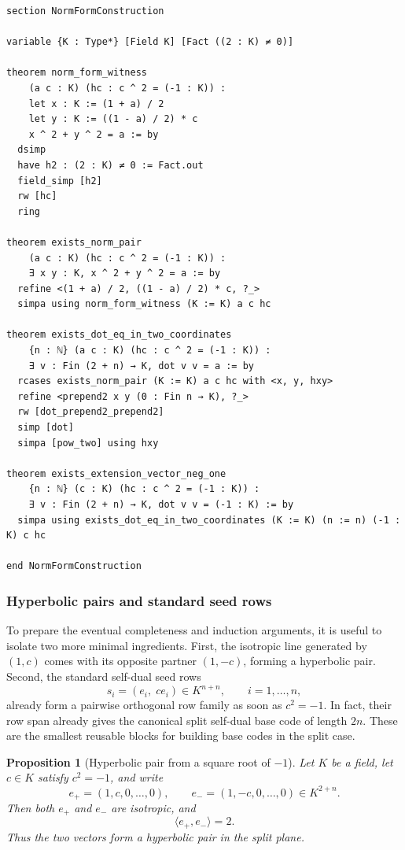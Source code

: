 \documentclass[12pt]{article}
\newtheorem{prop}[theorem]{Proposition}
\begin{document}
\begin{lstlisting}[caption={Lean verification for Theorem~\ref{thm:norm-witness}.}]
section NormFormConstruction

variable {K : Type*} [Field K] [Fact ((2 : K) ≠ 0)]

theorem norm_form_witness
    (a c : K) (hc : c ^ 2 = (-1 : K)) :
    let x : K := (1 + a) / 2
    let y : K := ((1 - a) / 2) * c
    x ^ 2 + y ^ 2 = a := by
  dsimp
  have h2 : (2 : K) ≠ 0 := Fact.out
  field_simp [h2]
  rw [hc]
  ring

theorem exists_norm_pair
    (a c : K) (hc : c ^ 2 = (-1 : K)) :
    ∃ x y : K, x ^ 2 + y ^ 2 = a := by
  refine <(1 + a) / 2, ((1 - a) / 2) * c, ?_>
  simpa using norm_form_witness (K := K) a c hc

theorem exists_dot_eq_in_two_coordinates
    {n : ℕ} (a c : K) (hc : c ^ 2 = (-1 : K)) :
    ∃ v : Fin (2 + n) → K, dot v v = a := by
  rcases exists_norm_pair (K := K) a c hc with <x, y, hxy>
  refine <prepend2 x y (0 : Fin n → K), ?_>
  rw [dot_prepend2_prepend2]
  simp [dot]
  simpa [pow_two] using hxy

theorem exists_extension_vector_neg_one
    {n : ℕ} (c : K) (hc : c ^ 2 = (-1 : K)) :
    ∃ v : Fin (2 + n) → K, dot v v = (-1 : K) := by
  simpa using exists_dot_eq_in_two_coordinates (K := K) (n := n) (-1 : K) c hc

end NormFormConstruction
\end{lstlisting}

\subsubsection{Hyperbolic pairs and standard seed rows}

To prepare the eventual completeness and induction arguments, it is useful to isolate two more minimal ingredients. First, the isotropic line generated by $(1,c)$ comes with its opposite partner $(1,-c)$, forming a hyperbolic pair. Second, the standard self-dual seed rows
\[
s_i=(e_i,\; c e_i)\in K^{n+n},
\qquad i=1,\dots,n,
\]
already form a pairwise orthogonal row family as soon as $c^2=-1$. In fact, their row span already gives the canonical split self-dual base code of length $2n$. These are the smallest reusable blocks for building base codes in the split case.

\begin{prop}[Hyperbolic pair from a square root of $-1$]
\label{prop:hyperbolic-pair}
Let $K$ be a field, let $c\in K$ satisfy $c^2=-1$, and write
\[
e_+=(1,c,0,\ldots,0),
\qquad
e_-=(1,-c,0,\ldots,0)\in K^{2+n}.
\]
Then both $e_+$ and $e_-$ are isotropic, and
\[
\langle e_+,e_-\rangle = 2.
\]
Thus the two vectors form a hyperbolic pair in the split plane.
\end{prop}
\end{document}

